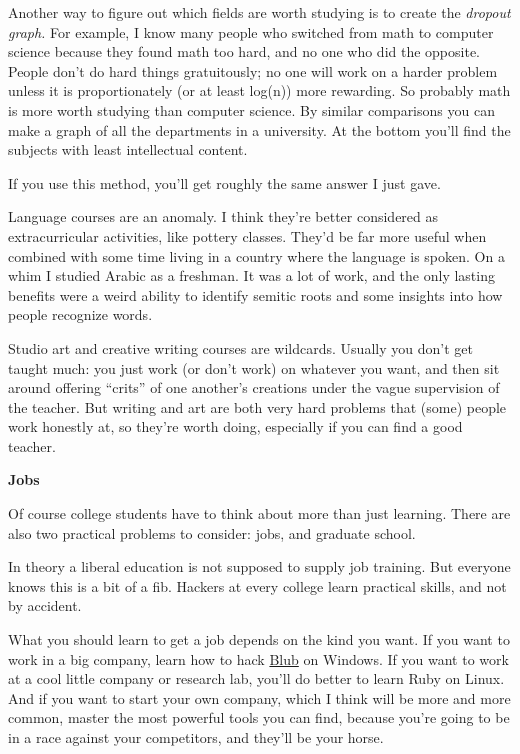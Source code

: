 Another way to figure out which fields are worth studying is to create
the \emph{dropout graph.} For example, I know many people who switched
from math to computer science because they found math too hard, and no
one who did the opposite. People don't do hard things gratuitously; no
one will work on a harder problem unless it is proportionately (or at
least log(n)) more rewarding. So probably math is more worth studying
than computer science. By similar comparisons you can make a graph of
all the departments in a university. At the bottom you'll find the
subjects with least intellectual content.

If you use this method, you'll get roughly the same answer I just gave.

Language courses are an anomaly. I think they're better considered as
extracurricular activities, like pottery classes. They'd be far more
useful when combined with some time living in a country where the
language is spoken. On a whim I studied Arabic as a freshman. It was a
lot of work, and the only lasting benefits were a weird ability to
identify semitic roots and some insights into how people recognize
words.

Studio art and creative writing courses are wildcards. Usually you don't
get taught much: you just work (or don't work) on whatever you want, and
then sit around offering ``crits'' of one another's creations under the
vague supervision of the teacher. But writing and art are both very hard
problems that (some) people work honestly at, so they're worth doing,
especially if you can find a good teacher.

\textbf{Jobs}

Of course college students have to think about more than just learning.
There are also two practical problems to consider: jobs, and graduate
school.

In theory a liberal education is not supposed to supply job training.
But everyone knows this is a bit of a fib. Hackers at every college
learn practical skills, and not by accident.

What you should learn to get a job depends on the kind you want. If you
want to work in a big company, learn how to hack \href{avg.html}{Blub}
on Windows. If you want to work at a cool little company or research
lab, you'll do better to learn Ruby on Linux. And if you want to start
your own company, which I think will be more and more common, master the
most powerful tools you can find, because you're going to be in a race
against your competitors, and they'll be your horse.

